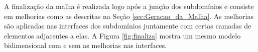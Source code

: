 A finalização da malha é realizada logo após a junção dos subdomínios e consiste em melhorias como as descritas na Seção \ref{sec:Geracao_da_Malha}. As melhorias são aplicadas nas interfaces dos subdomínios juntamente com certas camadas de elementos adjacentes a elas. A Figura \ref{fig:finaliza} mostra um mesmo modelo bidimensional com e sem as melhorias nas interfaces.

\begin{figure}[!ht]
	\centering
	\qquad
\end{figure}
